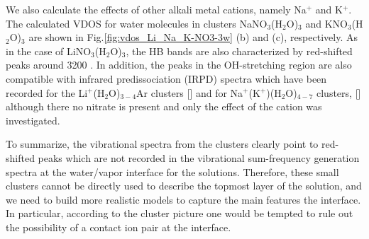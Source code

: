 %

We also calculate the effects of other alkali metal cations, namely Na$^+$ and K$^+$. 
The calculated VDOS for water molecules in clusters NaNO$_3$(H$_2$O)$_3$ and KNO$_3$(H$_2$O)$_3$ are shown in 
Fig.\thinspace\ref{fig:vdos_Li_Na_K-NO3-3w} (b) and (c), respectively. As in the case of LiNO$_3$(H$_2$O)$_3$, the HB 
bands are also characterized by red-shifted peaks around 3200 \centimeter.
In addition, the peaks in the OH-stretching region are also compatible with infrared predissociation
(IRPD) spectra which have been recorded for the Li$^+$(H$_2$O)$_{3-4}$Ar
clusters [\cite{rodriguez2011, Miller2008, miller2010b}]
and for Na$^+$(K$^+$)(H$_2$O)$_{4-7}$ clusters, [\cite{beck2011}] although there no
nitrate is present and only the effect of the cation was investigated.

To summarize, the vibrational spectra from the clusters clearly point to red-shifted peaks which are not 
recorded in the vibrational sum-frequency generation spectra at the water/vapor interface for the \LiN solutions. 
Therefore, these small clusters cannot be directly used to describe the topmost layer of the \LiN solution, 
and we need to build more realistic models to capture the main features the interface. 
In particular, according to the cluster picture one would be tempted to rule out the possibility of a contact 
ion pair at the interface.


